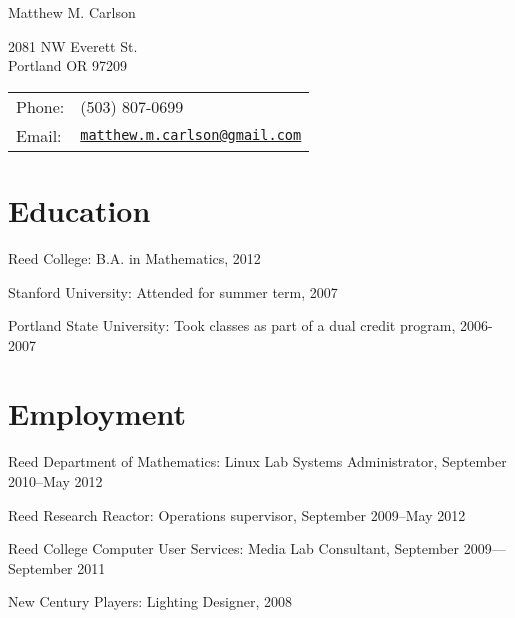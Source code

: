 \documentclass[letterpaper]{article}
\def\name{Matthew M. Carlson}%
\renewenvironment{itemize}{\begin{list}{}{\setlength{\leftmargin}{1.5em}}}{\end{list}}%
\begin{document}
{\huge \name}%
\vspace{0.25in}

\begin{minipage}{0.45\linewidth}
	2081 NW Everett St. \\
	Portland OR 97209
\end{minipage}
\begin{minipage}{0.45\linewidth}
	\begin{tabular}{ll}
	Phone: & (503) 807-0699 \\
	Email: & \href{mailto:matthew.m.carlson@gmail.com}{\tt matthew.m.carlson@gmail.com} \\
  \end{tabular}
\end{minipage}





\section*{Education}

\begin{itemize}
  \item Reed College: B.A. in Mathematics, 2012
  \item Stanford University: Attended for summer term, 2007
  \item Portland State University: Took classes as part of a dual credit program, 2006-2007
\end{itemize}


\section*{Employment}%

\begin{itemize}
\item Reed Department of Mathematics: Linux Lab Systems Administrator, September 2010--May 2012
\item Reed Research Reactor: Operations supervisor, September 2009--May 2012
\item Reed College Computer User Services: Media Lab Consultant, September 2009---September 2011
\item New Century Players: Lighting Designer, 2008
\end{itemize}
\end{document}
